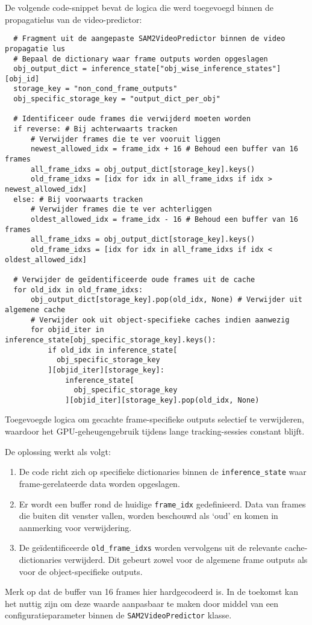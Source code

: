 De volgende code-snippet bevat de logica die werd toegevoegd binnen de propagatielus van de video-predictor:
\begin{listing}[H]
  \fontsize{10pt}{10pt}
  \begin{verbatim}
  # Fragment uit de aangepaste SAM2VideoPredictor binnen de video propagatie lus
  # Bepaal de dictionary waar frame outputs worden opgeslagen
  obj_output_dict = inference_state["obj_wise_inference_states"][obj_id]
  storage_key = "non_cond_frame_outputs"
  obj_specific_storage_key = "output_dict_per_obj"

  # Identificeer oude frames die verwijderd moeten worden
  if reverse: # Bij achterwaarts tracken
      # Verwijder frames die te ver vooruit liggen
      newest_allowed_idx = frame_idx + 16 # Behoud een buffer van 16 frames
      all_frame_idxs = obj_output_dict[storage_key].keys()
      old_frame_idxs = [idx for idx in all_frame_idxs if idx > newest_allowed_idx]
  else: # Bij voorwaarts tracken
      # Verwijder frames die te ver achterliggen
      oldest_allowed_idx = frame_idx - 16 # Behoud een buffer van 16 frames
      all_frame_idxs = obj_output_dict[storage_key].keys()
      old_frame_idxs = [idx for idx in all_frame_idxs if idx < oldest_allowed_idx]

  # Verwijder de geïdentificeerde oude frames uit de cache
  for old_idx in old_frame_idxs:
      obj_output_dict[storage_key].pop(old_idx, None) # Verwijder uit algemene cache
      # Verwijder ook uit object-specifieke caches indien aanwezig
      for objid_iter in inference_state[obj_specific_storage_key].keys():
          if old_idx in inference_state[
            obj_specific_storage_key
          ][objid_iter][storage_key]:
              inference_state[
                obj_specific_storage_key
              ][objid_iter][storage_key].pop(old_idx, None)
  \end{verbatim}
  \caption[Geheugenoptimalisatie in SAM2 door caching van frame outputs]{Toegevoegde logica om gecachte frame-specifieke outputs selectief te verwijderen, waardoor het GPU-geheugengebruik tijdens lange tracking-sessies constant blijft.}
  \label{lst:sam2-memory-fix}
\end{listing}

De oplossing werkt als volgt:
\begin{enumerate}
  \item De code richt zich op specifieke dictionaries binnen de \texttt{inference\_state} waar frame-gerelateerde data worden opgeslagen.
  \item Er wordt een buffer rond de huidige \texttt{frame\_idx} gedefinieerd. Data van frames die buiten dit venster vallen, worden beschouwd als `oud' en komen in aanmerking voor verwijdering.
  \item De geïdentificeerde \texttt{old\_frame\_idxs} worden vervolgens uit de relevante ca\-che-dictionaries verwijderd. Dit gebeurt zowel voor de algemene frame outputs als voor de object-specifieke outputs.
\end{enumerate}
Merk op dat de buffer van 16 frames hier hardgecodeerd is. 
In de toekomst kan het nuttig zijn om deze waarde aanpasbaar te maken door middel van een configuratieparameter binnen de \texttt{SAM2VideoPredictor} klasse.

